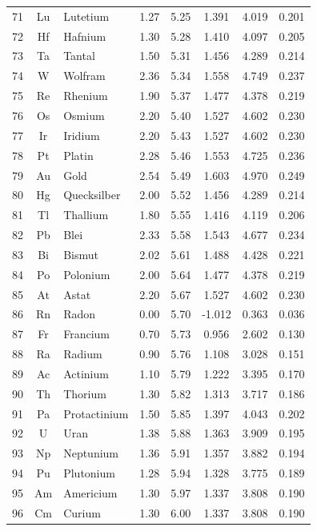 \documentclass[12pt,a4paper]{article}
\begin{document}
\begin{longtable}{|c|c|p{2.5cm}|c|c|c|c|c|}
		71 & Lu & Lutetium & 1.27 & 5.25 & 1.391 & 4.019 & 0.201 \\
		72 & Hf & Hafnium & 1.30 & 5.28 & 1.410 & 4.097 & 0.205 \\
		73 & Ta & Tantal & 1.50 & 5.31 & 1.456 & 4.289 & 0.214 \\
		74 & W & Wolfram & 2.36 & 5.34 & 1.558 & 4.749 & 0.237 \\
		75 & Re & Rhenium & 1.90 & 5.37 & 1.477 & 4.378 & 0.219 \\
		76 & Os & Osmium & 2.20 & 5.40 & 1.527 & 4.602 & 0.230 \\
		77 & Ir & Iridium & 2.20 & 5.43 & 1.527 & 4.602 & 0.230 \\
		78 & Pt & Platin & 2.28 & 5.46 & 1.553 & 4.725 & 0.236 \\
		79 & Au & Gold & 2.54 & 5.49 & 1.603 & 4.970 & 0.249 \\
		80 & Hg & Quecksilber & 2.00 & 5.52 & 1.456 & 4.289 & 0.214 \\
		81 & Tl & Thallium & 1.80 & 5.55 & 1.416 & 4.119 & 0.206 \\
		82 & Pb & Blei & 2.33 & 5.58 & 1.543 & 4.677 & 0.234 \\
		83 & Bi & Bismut & 2.02 & 5.61 & 1.488 & 4.428 & 0.221 \\
		84 & Po & Polonium & 2.00 & 5.64 & 1.477 & 4.378 & 0.219 \\
		85 & At & Astat & 2.20 & 5.67 & 1.527 & 4.602 & 0.230 \\
		86 & Rn & Radon & 0.00 & 5.70 & -1.012 & 0.363 & 0.036 \\
		87 & Fr & Francium & 0.70 & 5.73 & 0.956 & 2.602 & 0.130 \\
		88 & Ra & Radium & 0.90 & 5.76 & 1.108 & 3.028 & 0.151 \\
		89 & Ac & Actinium & 1.10 & 5.79 & 1.222 & 3.395 & 0.170 \\
		90 & Th & Thorium & 1.30 & 5.82 & 1.313 & 3.717 & 0.186 \\
		91 & Pa & Protactinium & 1.50 & 5.85 & 1.397 & 4.043 & 0.202 \\
		92 & U & Uran & 1.38 & 5.88 & 1.363 & 3.909 & 0.195 \\
		93 & Np & Neptunium & 1.36 & 5.91 & 1.357 & 3.882 & 0.194 \\
		94 & Pu & Plutonium & 1.28 & 5.94 & 1.328 & 3.775 & 0.189 \\
		95 & Am & Americium & 1.30 & 5.97 & 1.337 & 3.808 & 0.190 \\
		96 & Cm & Curium & 1.30 & 6.00 & 1.337 & 3.808 & 0.190 \\

\end{longtable}
\end{document}
